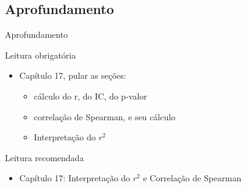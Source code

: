 \documentclass{beamer}
\begin{document}
\subsection{Aprofundamento}

\begin{frame}{\scriptsize Aprofundamento}
  \begin{block}{Leitura obrigatória}
    \footnotesize
    \begin{itemize}
      \footnotesize
    \item Capítulo 17, pular as seções:
      \begin{itemize}
        \scriptsize
      \item cálculo do r, do IC, do p-valor
      \item correlação de Spearman, e seu cálculo
      \item Interpretação do $r^2$
      \end{itemize}
    \end{itemize}
  \end{block}
  \begin{block}{Leitura recomendada}
    \begin{itemize}
      \scriptsize
    \item Capítulo 17: Interpretação do $r^2$ e Correlação de Spearman
    \end{itemize}
  \end{block}
\end{frame}
\end{document}
